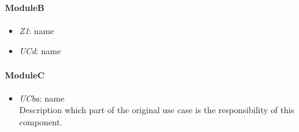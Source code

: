     \paragraph{ModuleB}
    \begin{itemize}
    	\item \emph{Z1}: name
    	\item \emph{UCd}: name
    \end{itemize}

    \paragraph{ModuleC}
    \begin{itemize}
    	\item \emph{UCba}: name\\Description which part of the original use case is
    	the responsibility of this component.
    \end{itemize}
